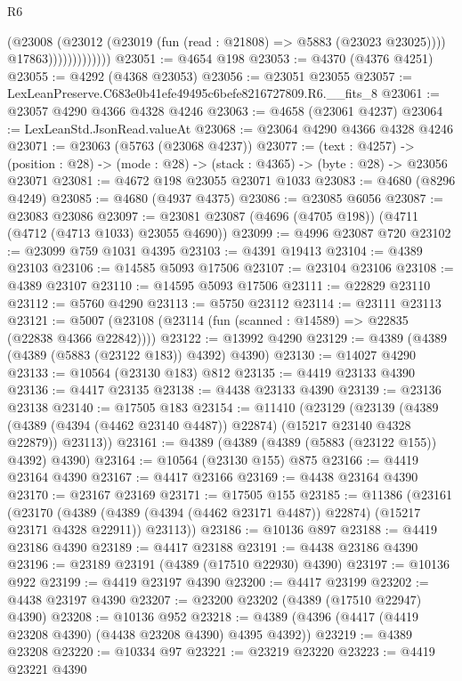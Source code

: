 \begin{lexlean}{R6}
\begin{coremodule}
                            (@23008
                              (@23012 (@23019 (fun (read : @21808) => @5883 (@23023 @23025))))
                              @17863)))))))))))))
@23051 := @4654 @198
@23053 := @4370 (@4376 @4251)
@23055 := @4292 (@4368 @23053)
@23056 := @23051 @23055
@23057 := LexLeanPreserve.C683e0b41efe49495c6befe8216727809.R6.__fits_8
@23061 := @23057 @4290 @4366 @4328 @4246
@23063 := @4658 (@23061 @4237)
@23064 := LexLeanStd.JsonRead.valueAt
@23068 := @23064 @4290 @4366 @4328 @4246
@23071 := @23063 (@5763 (@23068 @4237))
@23077 := (text : @4257) ->
  (position : @28) -> (mode : @28) -> (stack : @4365) -> (byte : @28) -> @23056 @23071
@23081 := @4672 @198 @23055 @23071 @1033
@23083 := @4680 (@8296 @4249)
@23085 := @4680 (@4937 @4375)
@23086 := @23085 @6056
@23087 := @23083 @23086
@23097 := @23081 @23087 (@4696 (@4705 @198)) (@4711 (@4712 (@4713 @1033) @23055 @4690))
@23099 := @4996 @23087 @720
@23102 := @23099 @759 @1031 @4395
@23103 := @4391 @19413
@23104 := @4389 @23103
@23106 := @14585 @5093 @17506
@23107 := @23104 @23106
@23108 := @4389 @23107
@23110 := @14595 @5093 @17506
@23111 := @22829 @23110
@23112 := @5760 @4290
@23113 := @5750 @23112
@23114 := @23111 @23113
@23121 := @5007 (@23108 (@23114 (fun (scanned : @14589) => @22835 (@22838 @4366 @22842))))
@23122 := @13992 @4290
@23129 := @4389 (@4389 (@4389 (@5883 (@23122 @183)) @4392) @4390)
@23130 := @14027 @4290
@23133 := @10564 (@23130 @183) @812
@23135 := @4419 @23133 @4390
@23136 := @4417 @23135
@23138 := @4438 @23133 @4390
@23139 := @23136 @23138
@23140 := @17505 @183
@23154 := @11410
    (@23129
      (@23139
        (@4389 (@4389 (@4394 (@4462 @23140 @4487)) @22874) (@15217 @23140 @4328 @22879))
        @23113))
@23161 := @4389 (@4389 (@4389 (@5883 (@23122 @155)) @4392) @4390)
@23164 := @10564 (@23130 @155) @875
@23166 := @4419 @23164 @4390
@23167 := @4417 @23166
@23169 := @4438 @23164 @4390
@23170 := @23167 @23169
@23171 := @17505 @155
@23185 := @11386
    (@23161
      (@23170
        (@4389 (@4389 (@4394 (@4462 @23171 @4487)) @22874) (@15217 @23171 @4328 @22911))
        @23113))
@23186 := @10136 @897
@23188 := @4419 @23186 @4390
@23189 := @4417 @23188
@23191 := @4438 @23186 @4390
@23196 := @23189 @23191 (@4389 (@17510 @22930) @4390)
@23197 := @10136 @922
@23199 := @4419 @23197 @4390
@23200 := @4417 @23199
@23202 := @4438 @23197 @4390
@23207 := @23200 @23202 (@4389 (@17510 @22947) @4390)
@23208 := @10136 @952
@23218 := @4389 (@4396 (@4417 (@4419 @23208 @4390) (@4438 @23208 @4390) @4395 @4392))
@23219 := @4389 @23208
@23220 := @10334 @97
@23221 := @23219 @23220
@23223 := @4419 @23221 @4390

\end{coremodule}
\end{lexlean}
